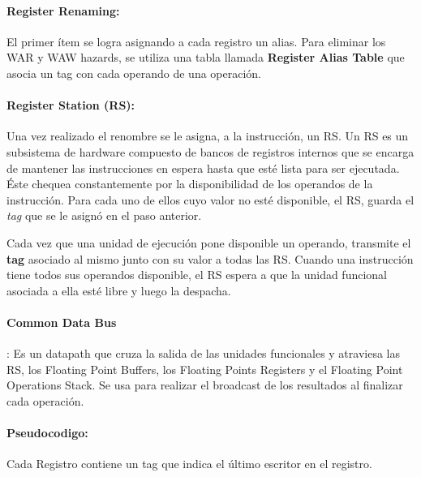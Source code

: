 \paragraph{Register Renaming:} El primer ítem se logra asignando a cada registro un alias. Para eliminar los WAR y WAW hazards, se utiliza una tabla llamada \textbf{Register Alias Table} que asocia un tag con cada operando de una operación.

\paragraph{Register Station (RS):} Una vez realizado el renombre se le asigna, a la instrucción, un RS. Un RS es un subsistema de hardware compuesto de bancos de registros internos que se encarga de mantener las instrucciones en espera hasta que esté lista para ser ejecutada. Éste chequea constantemente por la disponibilidad de los operandos de la instrucción. Para cada uno de ellos cuyo valor no esté disponible, el RS, guarda el \textit{tag} que se le asignó en el paso anterior.

Cada vez que una unidad de ejecución pone disponible un operando, transmite el \textbf{tag} asociado al mismo junto con su valor a todas las RS. Cuando una instrucción tiene todos sus operandos disponible, el RS espera a que la unidad funcional asociada a ella esté libre y luego la despacha.

\paragraph{Common Data Bus}: Es un datapath que cruza la salida de las unidades funcionales y atraviesa las RS, los Floating Point Buffers, los Floating Points Registers y el Floating Point Operations Stack. Se usa para realizar el broadcast de los resultados al finalizar cada operación.

\paragraph{Pseudocodigo:}
Cada Registro contiene un tag que indica el último escritor en el registro.

